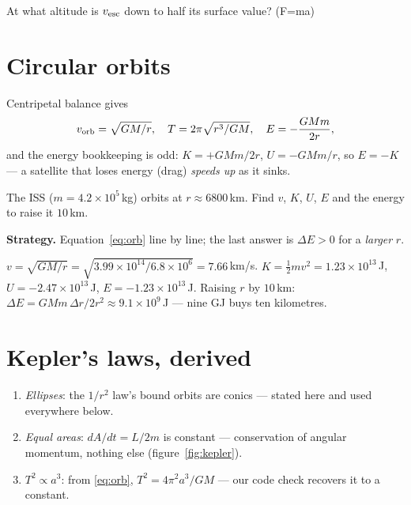 \begin{exercise}[easy]
At what altitude is $v_{\rm esc}$ down to half its surface value? (F=ma)
\end{exercise}

\section{Circular orbits}\label{sec:grav-orbit}

Centripetal balance gives
\begin{equation}
  v_{\rm orb}=\sqrt{GM/r},\quad T=2\pi\sqrt{r^{3}/GM},\quad
  E=-\frac{GMm}{2r},\label{eq:orb}
\end{equation}
and the energy bookkeeping is odd: $K=+GMm/2r$, $U=-GMm/r$, so $E=-K$
--- a satellite that loses energy (drag) \emph{speeds up} as it sinks.

\begin{example}\label{ex:iss}
The ISS ($m=4.2\times10^{5}$\,kg) orbits at $r\approx6800$\,km.
Find $v$, $K$, $U$, $E$ and the energy to raise it $10$\,km.
\par\smallskip
\textbf{Strategy.} Equation~\eqref{eq:orb} line by line; the last answer
is $\Delta E>0$ for a \emph{larger} $r$.
\begin{solution}
$v=\sqrt{GM/r}=\sqrt{3.99\times10^{14}/6.8\times10^{6}}=7.66$\,km/s.
$K=\tfrac12mv^{2}=1.23\times10^{13}$\,J, $U=-2.47\times10^{13}$\,J,
$E=-1.23\times10^{13}$\,J.
Raising $r$ by $10$\,km: $\Delta E=GMm\,\Delta r/2r^{2}
\approx9.1\times10^{9}$\,J --- nine GJ buys ten kilometres.
\checkmark
\end{solution}
\end{example}

\section{Kepler's laws, derived}\label{sec:grav-kepler}

\begin{enumerate}
\item \emph{Ellipses}: the $1/r^{2}$ law's bound orbits are conics ---
stated here and used everywhere below.
\item \emph{Equal areas}: $dA/dt=L/2m$ is constant --- conservation of
angular momentum, nothing else (figure~\ref{fig:kepler}).
\item \emph{$T^{2}\propto a^{3}$}: from \eqref{eq:orb},
$T^{2}=4\pi^{2}a^{3}/GM$ --- our code check recovers it to a constant.
\end{enumerate}

